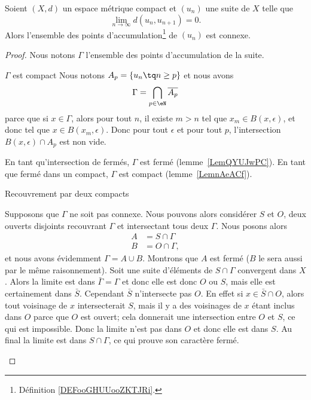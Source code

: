 \begin{proposition} \label{PropLHWACDU}
    Soient \( (X,d)\) un espace métrique compact et \( (u_n)\) une suite de \( X\) telle que
    \begin{equation}
        \lim_{n\to \infty} d(u_n,u_{n+1})=0.
    \end{equation}
    Alors l'ensemble des points d'accumulation\footnote{Définition \ref{DEFooGHUUooZKTJRi}.} de \( (u_n)\) est connexe.
\end{proposition}

\begin{proof}
    Nous notons \( \Gamma\) l'ensemble des points d'accumulation de la suite.
    \begin{subproof}
    \item[\( \Gamma\) est compact]
        Nous notons \( A_p=\{ u_n\tq n\geq p \}\) et nous avons
        \begin{equation}
            \Gamma=\bigcap_{p\in \eN}\overline{ A_p }
        \end{equation}
        parce que si \( x\in\Gamma\), alors pour tout \( n\), il existe \( m>n\) tel que \( x_m\in B(x,\epsilon)\), et donc tel que \( x\in B(x_m,\epsilon)\). Donc pour tout \( \epsilon\) et pour tout \( p\), l'intersection \( B(x,\epsilon)\cap A_p\) est non vide.

        En tant qu'intersection de fermés, \( \Gamma\) est fermé (lemme~\ref{LemQYUJwPC}). En tant que fermé dans un compact, \( \Gamma\) est compact (lemme~\ref{LemnAeACf}).

    \item[Recouvrement par deux compacts]

        Supposons que \( \Gamma\) ne soit pas connexe. Nous pouvons alors considérer \( S\) et \( O\), deux ouverts disjoints recouvrant \( \Gamma\) et intersectant tous deux \( \Gamma\). Nous posons alors
        \begin{subequations}
            \begin{align}
                A&=S\cap\Gamma\\
                B&=O\cap\Gamma,
            \end{align}
        \end{subequations}
        et nous avons évidemment \( \Gamma=A\cup B\). Montrons que \( A\) est fermé (\( B\) le sera aussi par le même raisonnement). Soit une suite d'éléments de \( S\cap \Gamma\) convergent dans \( X\). Alors la limite est dans \( \bar\Gamma=\Gamma\) et donc elle est donc \( O\) ou \( S\), mais elle est certainement dans \( \bar S\). Cependant \( \bar S\) n'intersecte pas \( O\). En effet si \( x\in \bar S\cap O\), alors tout voisinage de \( x\) intersecterait \( S\), mais il y a des voisinages de \( x\) étant inclus dans \( O\) parce que \( O\) est ouvert; cela donnerait une intersection entre \( O\) et \( S\), ce qui est impossible. Donc la limite n'est pas dans \( O\) et donc elle est dans \( S\). Au final la limite est dans \( S\cap \Gamma\), ce qui prouve son caractère fermé.


\end{subproof}
\end{proof}
